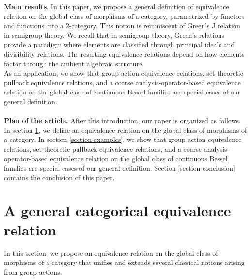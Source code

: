 \documentclass[a4paper,10pt]{article}
\theoremstyle{plain}
\theoremstyle{definition}
\theoremstyle{remark}
\begin{document}
\textbf{Main results}.
In this paper, we propose a general definition of equivalence relation on the global class of morphisms of a category, parametrized by functors and functions into a 2-category. This notion is reminiscent of Green's J relation \cite{CliffordPreston1961, Green1951, Howie1995} in semigroup theory. We recall that in semigroup theory, Green’s relations provide a paradigm where elements are classified through principal ideals and divisibility relations. The resulting equivalence relations depend on how elements factor through the ambient algebraic structure. \\
As an application, we show that group-action equivalence relations, set-theoretic pullback equivalence relations, and a coarse analysis-operator-based equivalence relation on the global class of continuous Bessel families are special cases of our general definition. \\ \\
\textbf{Plan of the article.} After this introduction, our paper is organized as follows. In section \ref{section-master}, we define an equivalence relation on the global class of morphisms of a category. In section \ref{section-examples}, we show that group-action equivalence relations, set-theoretic pullback equivalence relations, and a coarse analysis-operator-based equivalence relation on the global class of continuous Bessel families are special cases of our general definition. Section \ref{section-conclusion} contains the conclusion of this paper.

\section{A general categorical equivalence relation}
\label{section-master}

In this section, we propose an equivalence relation on the global class of morphisms of a category that unifies and extends several classical notions arising from group actions.
\end{document}
